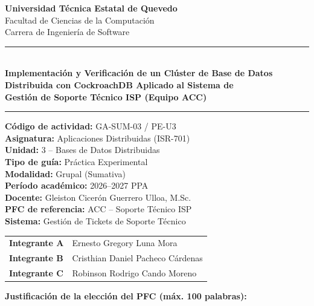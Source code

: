 \documentclass[12pt, a4paper]{article}
\begin{document}
\begin{titlepage}
\centering
\vspace*{0.2cm}
{\large\bfseries Universidad Técnica Estatal de Quevedo}\\[4pt]
{\normalsize Facultad de Ciencias de la Computación}\\[2pt]
{\normalsize Carrera de Ingeniería de Software}
\vspace{0.5cm}
\rule{\linewidth}{1pt}\\[6pt]
{\Large\bfseries
  Implementación y Verificación de un Clúster de Base de Datos\\[2pt]
  Distribuida con CockroachDB Aplicado al Sistema de\\[2pt]
  Gestión de Soporte Técnico ISP (Equipo ACC)
}
\vspace{2pt}
\rule{\linewidth}{1pt}
\vspace{0.5cm}
{\small
  \textbf{Código de actividad:} GA-SUM-03 / PE-U3\\[2pt]
  \textbf{Asignatura:} Aplicaciones Distribuidas (ISR-701)\\[2pt]
  \textbf{Unidad:} 3 -- Bases de Datos Distribuidas\\[2pt]
  \textbf{Tipo de guía:} Práctica Experimental\\[2pt]
  \textbf{Modalidad:} Grupal (Sumativa)\\[2pt]
  \textbf{Período académico:} 2026--2027 PPA\\[2pt]
  \textbf{Docente:} Gleiston Cicerón Guerrero Ulloa, M.Sc.\\[2pt]
  \textbf{PFC de referencia:} ACC -- Soporte Técnico ISP\\[2pt]
  \textbf{Sistema:} Gestión de Tickets de Soporte Técnico
}
\vspace{0.4cm}
{\small
\begin{tabular}{@{}ll@{}}
\textbf{Integrante A} & Ernesto Gregory Luna Mora \\[2pt]
\textbf{Integrante B} & Cristhian Daniel Pacheco Cárdenas \\[2pt]
\textbf{Integrante C} & Robinson Rodrigo Cando Moreno \\
\end{tabular}
}
\vspace{0.4cm}
\begin{minipage}{0.85\linewidth}
\centering
\small
\textbf{Justificación de la elección del PFC (máx. 100 palabras):}\\[3pt]

\end{minipage}
\end{titlepage}
\end{document}
